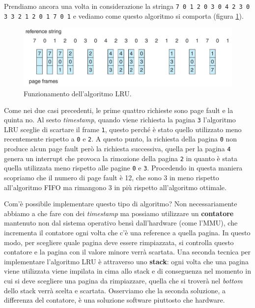 Prendiamo ancora una volta in considerazione la stringa \texttt{\small 7 0 1 2 0 3 0 4 2 3 0 3 3 2 1 2 0 1 7 0 1} e vediamo come questo algoritmo si comporta (figura \ref{fig:LRU}).
\begin{figure}[h]
    \centering
    \includegraphics[width = .85\textwidth]{../res/imgs/virtual memory/LRU.png}
    \caption{Funzionamento dell'algoritmo LRU.}
    \label{fig:LRU}
\end{figure}
Come nei due casi precedenti, le prime quattro richieste sono page fault e la quinta no. Al sesto \textit{timestamp}, quando viene richiesta la pagina \texttt{3} l'algoritmo LRU sceglie di scartare il frame \texttt{1}, questo perché è stato quello utilizzato meno recentemente rispetto a \texttt{0} e \texttt{2}. A questo punto, la richiesta della pagina \texttt{0} non produce alcun page fault però la richiesta successiva, quella per la pagina \texttt{4} genera un interrupt che provoca la rimozione della pagina \texttt{2} in quanto è stata quella utilizzata meno rispetto alle pagine \texttt{0} e \texttt{3}. Procedendo in questa maniera scopriamo che il numero di page fault è 12, che sono 3 in meno rispetto all'algoritmo FIFO ma rimangono 3 in più rispetto all'algoritmo ottimale.

Com'è possibile implementare questo tipo di algoritmo? Non necessariamente abbiamo a che fare con dei \textit{timestamp} ma possiamo utilizzare un \textbf{contatore} mantenuto non dal sistema operativo bensì dall'hardware (come l'MMU), che incrementa il contatore ogni volta che c'è una reference a quella pagina. In questo modo, per scegliere quale pagina deve essere rimpiazzata, si controlla questo contatore e la pagina con il valore minore verrà scartata. Una seconda tecnica per implementare l'algoritmo LRU è attraverso uno \textbf{stack}: ogni volta che una pagina viene utilizzata viene impilata in cima allo stack e di conseguenza nel momento in cui si deve scegliere una pagina da rimpiazzare, quella che si troverà nel \textit{bottom} dello stack verrà scelta e scartata. Osserviamo che la seconda soluzione, a differenza del contatore, è una soluzione software piuttosto che hardware.

% 
